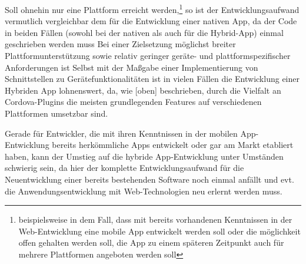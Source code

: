 Soll ohnehin nur eine Plattform erreicht werden,\footnote{beispielsweise in dem Fall, dass mit bereits vorhandenen Kenntnissen in der Web-Entwicklung eine mobile App entwickelt werden soll oder die möglichkeit offen gehalten werden soll, die App zu einem späteren Zeitpunkt auch für mehrere Plattformen angeboten werden soll} so ist der Entwicklungsaufwand vermutlich vergleichbar dem für die Entwicklung einer nativen App, da der Code in beiden Fällen (sowohl bei der nativen als auch für die Hybrid-App) einmal geschrieben werden muss %
Bei einer Zielsetzung möglichst breiter Plattformunterstützung sowie relativ geringer geräte- und plattformspezifischer Anforderungen ist 
Selbst mit der Maßgabe einer Implementierung von Schnittstellen zu Gerätefunktionalitäten ist in vielen Fällen die Entwicklung einer Hybriden App lohnenswert, da, wie [oben] beschrieben, durch die Vielfalt an Cordova-Plugins die meisten grundlegenden Features auf verschiedenen Plattformen umsetzbar sind. 


Gerade für Entwickler, die mit ihren Kenntnissen in der mobilen App-Entwicklung bereits herkömmliche Apps entwickelt oder gar am Markt etabliert haben, kann der Umstieg auf die hybride App-Entwicklung unter Umständen schwierig sein, da hier der komplette Entwicklungsaufwand für die Neuentwicklung einer bereits bestehenden Software noch einmal anfällt und evt. die Anwendungsentwicklung mit Web-Technologien neu erlernt werden muss.






